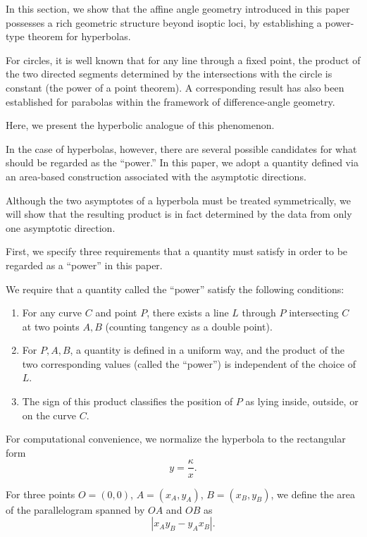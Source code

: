 \documentclass[12pt]{article}
\begin{document}
In this section, we show that the affine angle geometry introduced in this paper
possesses a rich geometric structure beyond isoptic loci,
by establishing a power-type theorem for hyperbolas.

For circles, it is well known that for any line through a fixed point,
the product of the two directed segments determined by the intersections
with the circle is constant (the power of a point theorem).
A corresponding result has also been established for parabolas
within the framework of difference-angle geometry.

Here, we present the hyperbolic analogue of this phenomenon.

In the case of hyperbolas, however, there are several possible candidates
for what should be regarded as the “power.”
In this paper, we adopt a quantity defined via an area-based construction
associated with the asymptotic directions.

Although the two asymptotes of a hyperbola must be treated symmetrically,
we will show that the resulting product is in fact determined
by the data from only one asymptotic direction.
\medskip

First, we specify three requirements that a quantity must satisfy
in order to be regarded as a “power” in this paper.

\begin{convention}
We require that a quantity called the “power” satisfy the following conditions:
\begin{enumerate}
\item For any curve $C$ and point $P$, there exists a line $L$ through $P$
intersecting $C$ at two points $A,B$ (counting tangency as a double point).

\item For $P,A,B$, a quantity is defined in a uniform way,
and the product of the two corresponding values (called the “power”)
is independent of the choice of $L$.

\item The sign of this product classifies the position of $P$
as lying inside, outside, or on the curve $C$.
\end{enumerate}
\end{convention}

\medskip

For computational convenience, we normalize the hyperbola to the rectangular form
\[
y=\frac{\kappa}{x}.
\]

For three points $O=(0,0)$, $A=(x_A,y_A)$, $B=(x_B,y_B)$,
we define the area of the parallelogram spanned by $OA$ and $OB$ as
\[
|x_Ay_B-y_Ax_B|.
\]
\end{document}
